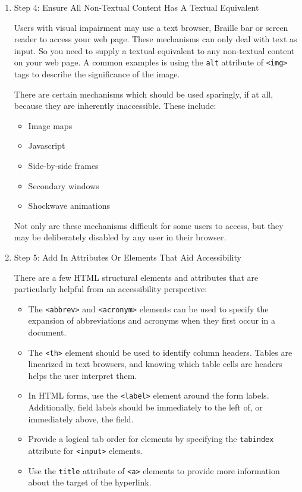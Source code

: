 \documentclass{article}
\begin{document}
\begin{enumerate}
\item Step 4: Ensure All Non-Textual Content Has A Textual Equivalent
\label{sec:orgheadline283}

Users with visual impairment may use a text browser, Braille bar or
screen reader to access your web page. These mechanisms can only deal
with text as input. So you need to supply a textual equivalent to any
non-textual content on your web page. A common examples is using the
\texttt{alt} attribute of \texttt{<img>} tags to describe the significance of the
image.

There are certain mechanisms which should be used sparingly, if at all,
because they are inherently inaccessible. These include:

\begin{itemize}
\item Image maps
\item Javascript
\item Side-by-side frames
\item Secondary windows
\item Shockwave animations
\end{itemize}

Not only are these mechanisms difficult for some users to access, but
they may be deliberately disabled by any user in their browser.

\item Step 5: Add In Attributes Or Elements That Aid Accessibility
\label{sec:orgheadline284}

There are a few HTML structural elements and attributes that are
particularly helpful from an accessibility perspective:

\begin{itemize}
\item The \texttt{<abbrev>} and \texttt{<acronym>} elements can be used to specify the
expansion of abbreviations and acronyms when they first occur in a
document.
\item The \texttt{<th>} element should be used to identify column headers. Tables
are linearized in text browsers, and knowing which table cells are
headers helps the user interpret them.
\item In HTML forms, use the \texttt{<label>} element around the form labels.
Additionally, field labels should be immediately to the left of, or
immediately above, the field.
\item Provide a logical tab order for elements by specifying the \texttt{tabindex}
   attribute for \texttt{<input>} elements.
\item Use the \texttt{title} attribute of \texttt{<a>} elements to provide more
information about the target of the hyperlink.
\end{itemize}


\end{enumerate}
\end{document}
